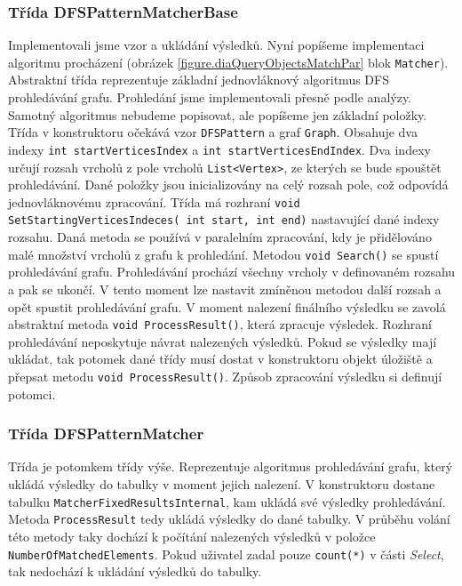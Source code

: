 \subsubsection{Třída DFSPatternMatcherBase}

Implementovali jsme vzor a ukládání výsledků.
Nyní popíšeme implementaci algoritmu procházení (obrázek \ref{figure.diaQueryObjectsMatchPar} blok \texttt{Matcher}).
Abstraktní třída reprezentuje základní jednovláknový algoritmus DFS prohledávání grafu.
Prohledání jsme implementovali přesně podle analýzy.
Samotný algoritmus nebudeme popisovat, ale popíšeme jen základní položky.
Třída v konstruktoru očekává vzor \texttt{DFSPattern} a graf \texttt{Graph}.
Obsahuje dva indexy \texttt{int startVerticesIndex} a \texttt{int startVerticesEndIndex}.
Dva indexy určují rozsah vrcholů z pole vrcholů \texttt{List<Vertex>}, ze kterých se bude spouštět prohledávání.
Dané položky jsou inicializovány na celý rozsah pole, což odpovídá jednovláknovému zpracování.
Třída má rozhraní \texttt{void SetStartingVerticesIndeces( int start, int end)} nastavující dané indexy rozsahu.
Daná metoda se používá v paralelním zpracování, kdy je přidělováno malé množství vrcholů z grafu k prohledání.
Metodou \texttt{void Search()} se spustí prohledávání grafu.
Prohledávání prochází všechny vrcholy v definovaném rozsahu a pak se ukončí.
V tento moment lze nastavit zmíněnou metodou další rozsah a opět spustit prohledávání grafu.
V moment nalezení finálního výsledku se zavolá abstraktní metoda \texttt{void ProcessResult()}, která zpracuje výsledek.
Rozhraní prohledávání neposkytuje návrat nalezených výsledků.
Pokud se výsledky mají ukládat, tak potomek dané třídy musí dostat v konstruktoru objekt úložiště a přepsat metodu \texttt{void ProcessResult()}.
Způsob zpracování výsledku si definují potomci.

\subsubsection{Třída DFSPatternMatcher}

Třída je potomkem třídy výše.
Reprezentuje algoritmus prohledávání grafu, který ukládá výsledky do tabulky v moment jejich nalezení.
V konstruktoru dostane tabulku \texttt{MatcherFixedResultsInternal}, kam ukládá své výsledky prohledávání.
Metoda \texttt{ProcessResult} tedy ukládá výsledky do dané tabulky.
V průběhu volání této metody taky dochází k počítání nalezených výsledků v položce \texttt{NumberOfMatchedElements}.
Pokud uživatel zadal pouze \texttt{count(*)} v části \textit{Select}, tak nedochází k ukládání výsledků do tabulky.

